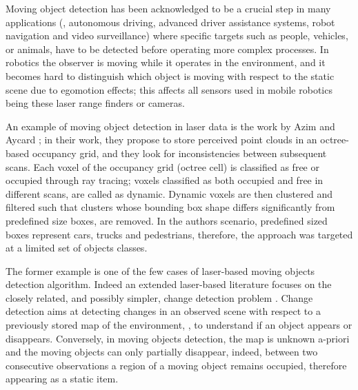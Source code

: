 Moving object detection has been acknowledged to be a crucial step in many applications (\eg, autonomous driving, advanced driver assistance systems, robot navigation and video surveillance) where specific targets such as  people, vehicles, or animals, have to be detected before operating more complex processes.
In robotics the observer is moving while it operates in the environment, and it becomes hard to distinguish which object is moving with respect to the static scene due to egomotion effects; this affects all sensors used in mobile robotics being these laser range finders or cameras.


An example of moving object detection in laser data is the work by Azim and Aycard \cite{azim2012detection}; in their work, they propose to store perceived point clouds in an octree-based occupancy grid, and they look for inconsistencies between subsequent scans. Each voxel  of the occupancy grid (octree cell) is classified as free or occupied through ray tracing; voxels classified as both occupied and free in different scans, are called as dynamic. 
Dynamic voxels are then clustered and filtered such that clusters whose bounding box shape differs significantly from predefined size boxes, are removed. In the authors scenario, predefined sized boxes represent cars, trucks and pedestrians, therefore, the approach was targeted at a limited set of objects classes.

The former example is one of the few cases of laser-based moving objects detection algorithm. Indeed an extended laser-based literature focuses on the closely related, and possibly simpler, change detection problem \cite{vieira2014spatial,andreasson2007has,drews2013fast,xiao2013change}.
Change detection  aims at detecting changes in an observed scene with respect to a previously stored map of the environment, \eg, to understand if an object appears or disappears. 
Conversely, in moving objects detection, the map is unknown a-priori and the moving objects can only partially disappear, indeed, between two consecutive observations a region of a moving object remains occupied, therefore appearing as a static item.

